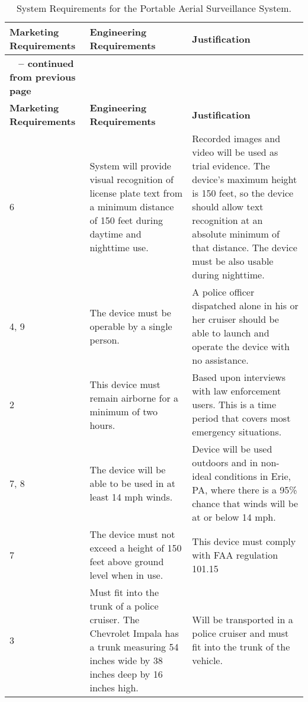\begin{longtable}{ |p{2.5cm}|p{5cm}|p{5cm}|} 
\caption{System Requirements for the Portable Aerial Surveillance System.}
\label{table:portableAerial}\\

\hline
\rowcolor{Gray}
\textbf{Marketing Requirements} & \textbf{Engineering Requirements} & \textbf{Justification} \\ \hline
\endfirsthead

\hline
\rowcolor{Gray}
\multicolumn{3}{|c|}
{{\bfseries \tablename\ \thetable{} -- continued from previous page}} \\ \hline
\rowcolor{Gray}
\textbf{Marketing Requirements} & \textbf{Engineering Requirements} & \textbf{Justification} \\ \hline
\endhead
\endfoot

6 & 
 System will provide visual recognition of license plate text from a
  minimum distance of 150 feet during daytime and nighttime use. &
   Recorded images and video will be used as trial
evidence. The device's maximum height is 150 feet, so
the device should allow text recognition at an absolute minimum of that
distance. The device must be also usable during nighttime.\\ \hline

4, 9 & 
   The device must be operable by a single person. &
 A police officer dispatched alone in his or her cruiser
should be able to launch and operate the device with no assistance. \\ \hline

2 & 
 This device must remain airborne for a minimum of two hours. &
Based upon interviews with law enforcement users. This
is a time period that covers most emergency situations. \\ \hline

7, 8 & 
 The device will be able to be used in at least 14 mph winds.&
 Device will be used outdoors and in non-ideal
conditions in Erie, PA, where there is a 95\% chance that winds will be
at or below 14 mph. \\ \hline

7 & 
  The device must not exceed a height of 150 feet above ground level
  when in use. &
  This device must comply with FAA regulation 101.15 \\ \hline
  
3 & 

  Must fit into the trunk of a police cruiser. The Chevrolet Impala has
  a trunk measuring 54 inches wide by 38 inches deep by 16 inches high. &
 Will be transported in a police cruiser and must fit
into the trunk of the vehicle. \\ \hline


\end{longtable}
